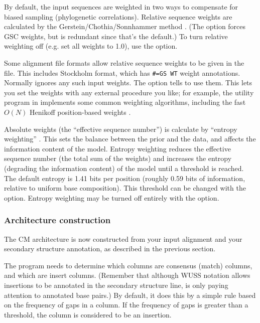 By default, the input sequences are weighted in two ways to compensate
for biased sampling (phylogenetic correlations).  Relative sequence
weights are calculated by the Gerstein/Chothia/Sonnhammer method
\cite{Gerstein94}.  (The  option forces GSC weights, but
is redundant since that's the default.)  To turn relative weighting
off (e.g. set all weights to 1.0), use the  option.

Some alignment file formats allow relative sequence weights to be
given in the file. This includes Stockholm format, which has
\verb+#=GS WT+ weight annotations. Normally  ignores any
such input weights.  The  option tells 
to use them.  This lets you set the weights with any external
procedure you like; for example, the  utility program in
 implements some common weighting algorithms,
including the fast $O(N)$ Henikoff position-based weights
\cite{Henikoff94b}.

Absolute weights (the ``effective sequence number'') is calculate by
``entropy weighting'' \cite{Karplus98}. This sets the balance between
the prior and the data, and affects the information content of the
model. Entropy weighting reduces the effective sequence number (the
total sum of the weights) and increases the entropy (degrading the
information content) of the model until a threshold is reached. The
default entropy is 1.41 bits per position (roughly 0.59 bits of
information, relative to uniform base composition). This threshold can
be changed with the  option. Entropy weighting may
be turned off entirely with the  option.


\subsubsection{Architecture construction}

The CM architecture is now constructed from your input alignment and
your secondary structure annotation, as described in the previous
section. 

The program needs to determine which columns are consensus (match)
columns, and which are insert columns. (Remember that although WUSS
notation allows insertions to be annotated in the secondary structure
line,  is only paying attention to annotated base
pairs.) By default, it does this by a simple rule based on the
frequency of gaps in a column. If the frequency of gaps is greater
than a threshold, the column is considered to be an insertion. 

